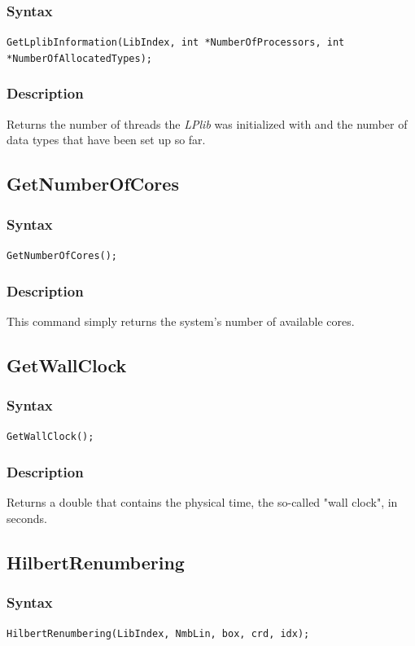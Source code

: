 \documentclass[a4paper,12pt]{article}
\begin{document}
\subsubsection*{Syntax}
\tt{GetLplibInformation(LibIndex, int *NumberOfProcessors, int *NumberOfAllocatedTypes);}
\normalfont

\subsubsection*{Description}
Returns the number of threads the \emph{LPlib} was initialized with and the number of data types that have been set up so far.


\subsection{GetNumberOfCores}

\subsubsection*{Syntax}
\tt{GetNumberOfCores();}
\normalfont

\subsubsection*{Description}
This command simply returns the system's number of available cores.

\subsection{GetWallClock}

\subsubsection*{Syntax}
\tt{GetWallClock();}
\normalfont

\subsubsection*{Description}
Returns a double that contains the physical time, the so-called "wall clock", in seconds.

\subsection{HilbertRenumbering}

\subsubsection*{Syntax}
\tt{HilbertRenumbering(LibIndex, NmbLin, box, crd, idx);}
\normalfont
\end{document}
